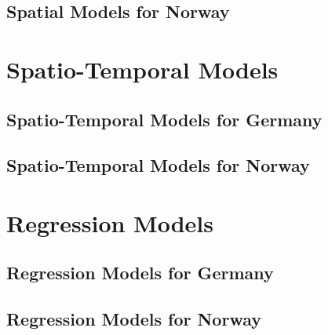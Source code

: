 \subsection{Spatial Models for Norway}
\clearpage
\section{Spatio-Temporal Models}
\subsection{Spatio-Temporal Models for Germany}
\subsection{Spatio-Temporal Models for Norway}
\section{Regression Models}
\clearpage
\subsection{Regression Models for Germany}
\subsection{Regression Models for Norway}